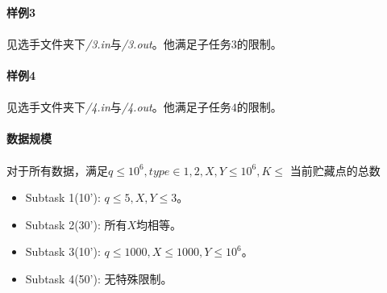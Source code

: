 \documentclass[UTF8]{ctexart}
\begin{document}
\paragraph{样例3}
\paragraph{}见选手文件夹下\emph{/3.in}与\emph{/3.out}。他满足子任务$3$的限制。
\paragraph{样例4}
\paragraph{}见选手文件夹下\emph{/4.in}与\emph{/4.out}。他满足子任务$4$的限制。
\paragraph{数据规模}
\paragraph{} 对于所有数据，满足$q\leq 10^{6},type\in{1,2}, X,Y\leq 10^{6}, K\leq$ 当前贮藏点的总数
\begin{itemize}
	\item Subtask 1(10'): $q\leq 5, X,Y\leq 3$。
	\item Subtask 2(30'): 所有$X$均相等。
	\item Subtask 3(10'): $q\leq 1000, X\leq 1000, Y\leq 10^{6}$。
	\item Subtask 4(50'): 无特殊限制。
\end{itemize}
\end{document}
